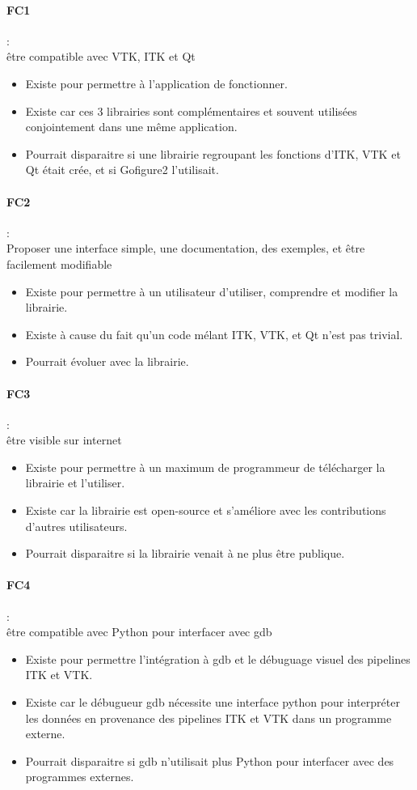 \paragraph*{FC1} :\\ être compatible avec VTK, ITK et Qt
\begin{itemize}
  \item Existe pour permettre à l'application de fonctionner.
  \item Existe car ces 3 librairies sont complémentaires et souvent utilisées conjointement dans une même application.
  \item Pourrait disparaitre si une librairie regroupant les fonctions d'ITK, VTK et Qt était crée, et si Gofigure2 l'utilisait.
\end{itemize}

\paragraph*{FC2} :\\ Proposer une interface simple, une documentation, des exemples, et être facilement modifiable
\begin{itemize}
  \item Existe pour permettre à un utilisateur d'utiliser, comprendre et modifier la librairie.
  \item Existe à cause du fait qu'un code mélant ITK, VTK, et Qt n'est pas trivial.
  \item Pourrait évoluer avec la librairie.
\end{itemize}

\paragraph*{FC3} :\\ être visible sur internet
\begin{itemize}
  \item Existe pour permettre à un maximum de programmeur de télécharger la librairie et l'utiliser.
  \item Existe car la librairie est open-source et s'améliore avec les contributions d'autres utilisateurs.
  \item Pourrait disparaitre si la librairie venait à ne plus être publique.
\end{itemize}

\paragraph*{FC4} :\\ être compatible avec Python pour interfacer avec gdb
\begin{itemize}
  \item Existe pour permettre l'intégration à gdb et le débuguage visuel des pipelines ITK et VTK.
  \item Existe car le débugueur gdb nécessite une interface python 
  pour interpréter les données en provenance 
  des pipelines ITK et VTK dans un programme externe.
  \item Pourrait disparaitre si gdb n'utilisait plus Python 
  pour interfacer avec des programmes externes.
\end{itemize}

